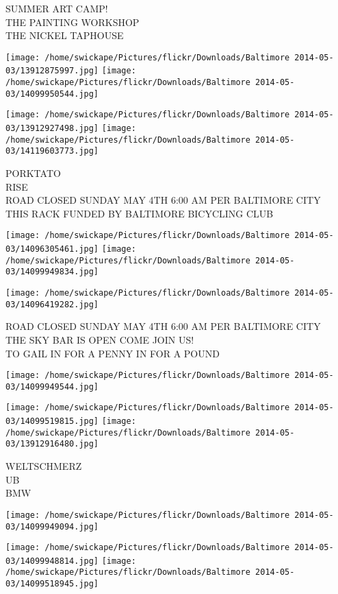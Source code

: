 \documentclass[10pt,letterpaper]{article}
\begin{document}
SUMMER ART CAMP!\\
THE PAINTING WORKSHOP\\
THE NICKEL TAPHOUSE
\pagebreak

\texttt{[image: /home/swickape/Pictures/flickr/Downloads/Baltimore 2014-05-03/13912875997.jpg]}
\texttt{[image: /home/swickape/Pictures/flickr/Downloads/Baltimore 2014-05-03/14099950544.jpg]}

\texttt{[image: /home/swickape/Pictures/flickr/Downloads/Baltimore 2014-05-03/13912927498.jpg]}
\texttt{[image: /home/swickape/Pictures/flickr/Downloads/Baltimore 2014-05-03/14119603773.jpg]}

PORKTATO\\
RISE\\
ROAD CLOSED SUNDAY MAY 4TH 6:00 AM PER BALTIMORE CITY\\
THIS RACK FUNDED BY BALTIMORE BICYCLING CLUB
\pagebreak

\texttt{[image: /home/swickape/Pictures/flickr/Downloads/Baltimore 2014-05-03/14096305461.jpg]}
\texttt{[image: /home/swickape/Pictures/flickr/Downloads/Baltimore 2014-05-03/14099949834.jpg]}

\texttt{[image: /home/swickape/Pictures/flickr/Downloads/Baltimore 2014-05-03/14096419282.jpg]}

ROAD CLOSED SUNDAY MAY 4TH 6:00 AM PER BALTIMORE CITY\\
THE SKY BAR IS OPEN COME JOIN US!\\
TO GAIL IN FOR A PENNY IN FOR A POUND
\pagebreak

\texttt{[image: /home/swickape/Pictures/flickr/Downloads/Baltimore 2014-05-03/14099949544.jpg]}

\vspace{0.25in}
\texttt{[image: /home/swickape/Pictures/flickr/Downloads/Baltimore 2014-05-03/14099519815.jpg]}
\texttt{[image: /home/swickape/Pictures/flickr/Downloads/Baltimore 2014-05-03/13912916480.jpg]}

WELTSCHMERZ\\
UB\\
BMW
\pagebreak

\texttt{[image: /home/swickape/Pictures/flickr/Downloads/Baltimore 2014-05-03/14099949094.jpg]}

\vspace{0.25in}
\texttt{[image: /home/swickape/Pictures/flickr/Downloads/Baltimore 2014-05-03/14099948814.jpg]}
\texttt{[image: /home/swickape/Pictures/flickr/Downloads/Baltimore 2014-05-03/14099518945.jpg]}
\end{document}
